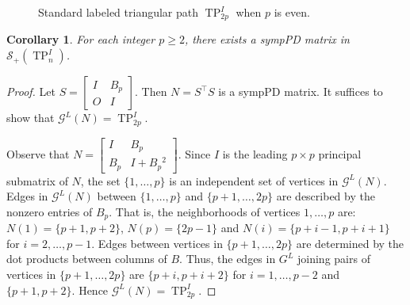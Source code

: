 \documentclass[12pt]{article}
\newtheorem{cor}[thm]{Corollary}
\theoremstyle{definition}
\theoremstyle{definition}
\theoremstyle{definition}
\numberwithin{figure}{section}
\numberwithin{equation}{section}
\newcommand{\GL}[1]{\mathcal{G} ^ #1}
\newcommand{\G}{\mathcal{G}}
\newcommand{\symp}{\mathcal{S}_+}
\newcommand{\tp}{\operatorname{TP}}
\newcommand{\trans}{^{\top}}
\newcommand{\mtx}[1]{\begin{bmatrix} #1 \end{bmatrix}}
\newcommand{\bpf}{\begin{proof}}
\newcommand{\epf}{\end{proof}\ms}
\newcommand{\ms}{\medskip}
\begin{document}
\begin{figure}[H]
\centering
{}
\caption{Standard labeled triangular path $\tp_{2p}^I$  when $p$ is even.}
\label{fig:tripatheven}
\end{figure}

\begin{cor}
\label{tp_is_sympd}
For each integer $p\geq 2$, there exists a sympPD matrix in $ \symp(\tp_n^I)$.
\end{cor}

\bpf
Let $S=\begin{bmatrix}
    I & B_p\\
    O &I 
\end{bmatrix}$.
Then $N=S\trans S$ is a sympPD matrix.
It 
suffices to show that $\GL L(N)=\tp_{2p}^I$.

Observe that $N=\mtx{I & B_p\\B_p & I+B_p{^2} 
}$.  
Since $I$ is the leading $p\times p$ 
principal submatrix of $N$,
the set $\{1,\dots,p\}$ is an independent
set of vertices in $\G^L(N)$.  Edges in $\G^L(N)$  between $\{1,\dots,p\}$ and $\{p+1,\dots,2p\}$ are described by the nonzero entries of $B_p$. That is, the neighborhoods of vertices $1, \ldots, p$ are:  $N(1)=\{p+1,p+2\}$, $N(p)=\{2p-1\}$ and $N(i)=\{p+i-1,p+i+1\}$ for $i=2,\dots,p-1$.
Edges between vertices in $\{ p+1, \ldots, 2p\}$ are determined by the
dot products between columns of $B$. 
Thus, the edges in $G^L$ joining
pairs of vertices in $\{p+1, \ldots, 2p\}$ are $\{p+i, p+i+2\}$ for $i=1,\ldots, p-2$  and $\{p+1,p+2\}$. Hence $ \G^L(N)=\tp_{2p}^I$.
\epf
\end{document}
